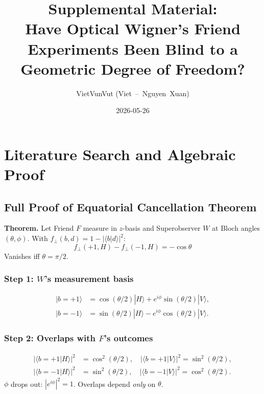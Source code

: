\documentclass[12pt]{article}
\begin{document}
\title{Supplemental Material:\\
Have Optical Wigner's Friend Experiments Been Blind to a Geometric Degree of Freedom?}
\author{VietVunVut (Viet~--~Nguyen~Xuan)}
\date{2026-05-26}
\maketitle

\renewcommand{\thesection}{S\arabic{section}}
\renewcommand{\theequation}{S\arabic{equation}}
\renewcommand{\thetable}{S\arabic{table}}

\section{Literature Search and Algebraic Proof}
\label{sec:S1}

\subsection{Full Proof of Equatorial Cancellation Theorem}

\textbf{Theorem.} Let Friend $F$ measure in $z$-basis and Superobserver $W$ at Bloch angles $(\theta,\phi)$.
With $f_\perp(b,d) = 1 - |\langle b|d\rangle|^2$:
\begin{equation}
f_\perp(+1, H) - f_\perp(-1, H) = -\cos\theta
\end{equation}
Vanishes iff $\theta = \pi/2$.

\subsubsection*{Step 1: $W$'s measurement basis}
\begin{align}
|b=+1\rangle &= \cos(\theta/2)|H\rangle + e^{i\phi}\sin(\theta/2)|V\rangle,\\
|b=-1\rangle &= \sin(\theta/2)|H\rangle - e^{i\phi}\cos(\theta/2)|V\rangle.
\end{align}

\subsubsection*{Step 2: Overlaps with $F$'s outcomes}
\begin{align}
|\langle b=+1|H\rangle|^2 &= \cos^2(\theta/2), \quad |\langle b=+1|V\rangle|^2 = \sin^2(\theta/2),\\
|\langle b=-1|H\rangle|^2 &= \sin^2(\theta/2), \quad |\langle b=-1|V\rangle|^2 = \cos^2(\theta/2).
\end{align}
$\phi$ drops out: $|e^{i\phi}|^2 = 1$. Overlaps depend \emph{only} on $\theta$.
\end{document}
